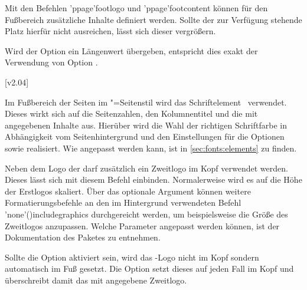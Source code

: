 \begin{DeclareEntity*}{}
\begin{DeclareEntity*}{}
\begin{DeclareEntity*}{}
\begin{Declaration}
Mit den Befehlen \Macro'ppage'{footlogo} und \Macro'ppage'{footcontent} können 
für den Fußbereich zusätzliche Inhalte definiert werden. Sollte der zur 
Verfügung stehende Platz hierfür nicht ausreichen, lässt sich dieser vergrößern.
\begin{DeclareValues}{}
  Wird der Option ein Längenwert übergeben, entspricht dies exakt der 
  Verwendung von Option .%
\end{DeclareValues}
\end{Declaration}

\begin{Declaration}
  {}
  [v2.04]

Im Fußbereich der Seiten im "=Seitenstil wird das 
Schriftelement~ verwendet. Dieses wirkt sich auf die 
Seitenzahlen, den Kolumnentitel und die mit  angegebenen 
Inhalte aus. Hierüber wird die Wahl der richtigen Schriftfarbe in Abhängigkeit 
vom Seitenhintergrund und den Einstellungen für die Optionen  
sowie  realisiert. Wie  angepasst werden 
kann, ist in \autoref{sec:fonts:elements} zu finden.
\end{Declaration}

\begin{Declaration}
  {}

Neben dem Logo der \TnUD darf zusätzlich ein Zweitlogo im Kopf verwendet 
werden. Dieses lässt sich mit diesem Befehl einbinden. Normalerweise wird es 
auf die Höhe der Erstlogos skaliert. Über das optionale Argument können weitere 
Formatierungsbefehle an den im Hintergrund verwendeten Befehl 
\Macro'none'(){includegraphics} durchgereicht werden, um 
beispielsweise die Größe des Zweitlogos anzupassen. Welche Parameter angepasst 
werden können, ist der Dokumentation des Paketes  zu 
entnehmen.

Sollte die Option  aktiviert sein, wird das \DDC-Logo nicht im Kopf 
sondern automatisch im Fuß gesetzt. Die Option  setzt dieses 
auf jeden Fall im Kopf und überschreibt damit das mit  
angegebene Zweitlogo.
\end{Declaration}


\end{DeclareEntity*}
\end{DeclareEntity*}
\end{DeclareEntity*}
